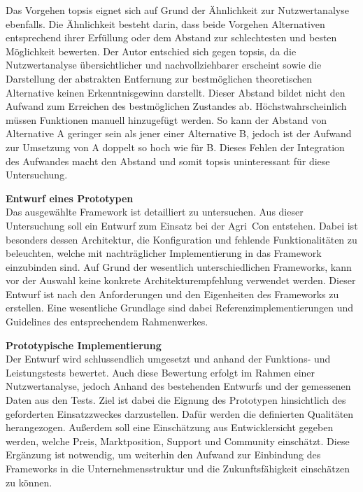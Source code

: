 Das Vorgehen \Gls{topsis} eignet sich auf Grund der Ähnlichkeit zur Nutzwertanalyse ebenfalls.
Die Ähnlichkeit besteht darin, dass beide Vorgehen Alternativen entsprechend ihrer Erfüllung oder dem Abstand zur schlechtesten und besten Möglichkeit bewerten.
Der Autor entschied sich gegen \Gls{topsis}, da die Nutzwertanalyse übersichtlicher und nachvollziehbarer erscheint sowie die Darstellung der abstrakten Entfernung zur bestmöglichen theoretischen Alternative keinen Erkenntnisgewinn darstellt.
Dieser Abstand bildet nicht den Aufwand zum Erreichen des bestmöglichen Zustandes ab. Höchstwahrscheinlich müssen Funktionen manuell hinzugefügt werden. So kann der Abstand von Alternative A geringer sein als jener einer Alternative B, jedoch ist der Aufwand zur Umsetzung von A doppelt so hoch wie für B.
Dieses Fehlen der Integration des Aufwandes macht den Abstand und somit \Gls{topsis} uninteressant für diese Untersuchung.

\textbf{Entwurf eines Prototypen}\\
Das ausgewählte Framework ist detailliert zu untersuchen.
Aus dieser Untersuchung soll ein Entwurf zum Einsatz bei der Agri~Con entstehen.
Dabei ist besonders dessen Architektur, die Konfiguration und fehlende Funktionalitäten zu beleuchten, welche mit nachträglicher Implementierung in das Framework einzubinden sind.
Auf Grund der wesentlich unterschiedlichen Frameworks, kann vor der Auswahl keine konkrete Architekturempfehlung verwendet werden. Dieser Entwurf ist nach den Anforderungen und den Eigenheiten des Frameworks zu erstellen. Eine wesentliche Grundlage sind dabei Referenzimplementierungen und Guidelines des entsprechendem Rahmenwerkes.

\textbf{Prototypische Implementierung}\\
Der Entwurf wird schlussendlich umgesetzt und anhand der Funktions- und Leistungstests bewertet.
Auch diese Bewertung erfolgt im Rahmen einer Nutzwertanalyse, jedoch Anhand des bestehenden Entwurfs und der gemessenen Daten aus den Tests.
Ziel ist dabei die Eignung des Prototypen hinsichtlich des geforderten Einsatzzweckes darzustellen.
Dafür werden die definierten Qualitäten herangezogen.
Außerdem soll eine Einschätzung aus Entwicklersicht gegeben werden, welche Preis, Marktposition, Support und Community einschätzt.
Diese Ergänzung ist notwendig, um weiterhin den Aufwand zur Einbindung des Frameworks in die Unternehmensstruktur und die Zukunftsfähigkeit einschätzen zu können.

